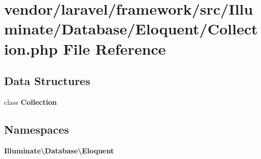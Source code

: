 \section{vendor/laravel/framework/src/\+Illuminate/\+Database/\+Eloquent/\+Collection.php File Reference}
\label{laravel_2framework_2src_2_illuminate_2_database_2_eloquent_2_collection_8php}
\subsection*{Data Structures}
\begin{DoxyCompactItemize}
\item 
class {\bf Collection}
\end{DoxyCompactItemize}
\subsection*{Namespaces}
\begin{DoxyCompactItemize}
\item 
 {\bf Illuminate\textbackslash{}\+Database\textbackslash{}\+Eloquent}
\end{DoxyCompactItemize}

